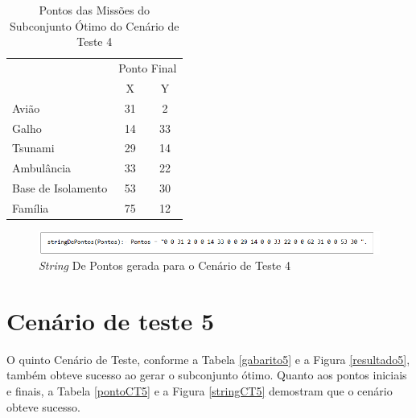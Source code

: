 \begin{table}[!h]
\centering
\caption{Pontos das Missões do Subconjunto Ótimo do Cenário de Teste 4}
\label{pontoCT4}
\begin{tabular}{lcc}
\rowcolor[HTML]{00D2CB} 
\multicolumn{1}{c}{\cellcolor[HTML]{00D2CB}} & \multicolumn{2}{l}{\cellcolor[HTML]{00D2CB}Ponto Final} \\ 
\rowcolor[HTML]{C0F2F0} 
\multicolumn{1}{c}{\cellcolor[HTML]{00D2CB}Missão} & \multicolumn{1}{c}{\cellcolor[HTML]{C0F2F0}X} & \multicolumn{1}{c}{\cellcolor[HTML]{C0F2F0}Y} \\
 Avião & 31 & 2 \\
 Galho & 14 & 33 \\
 Tsunami & 29 & 14 \\
 Ambulância & 33 & 22 \\
 Base de Isolamento & 53 & 30 \\
 Família & 75 & 12 \\          
\end{tabular}
\end{table}


\FloatBarrier
\begin{figure}[!h]
\centering
\includegraphics[keepaspectratio=true,scale=0.7]{figuras/stringCT4.png}
\caption{\textit{String} De Pontos gerada para o Cenário de Teste 4}
\label{stringCT4}
\end{figure}



\section{Cenário de teste 5}

	O quinto Cenário de Teste, conforme a Tabela \ref{gabarito5} e a Figura \ref{resultado5}, também obteve sucesso ao gerar o subconjunto ótimo. Quanto aos pontos iniciais e finais, a Tabela \ref{pontoCT5} e a Figura \ref{stringCT5} demostram que o cenário obteve sucesso.
	
